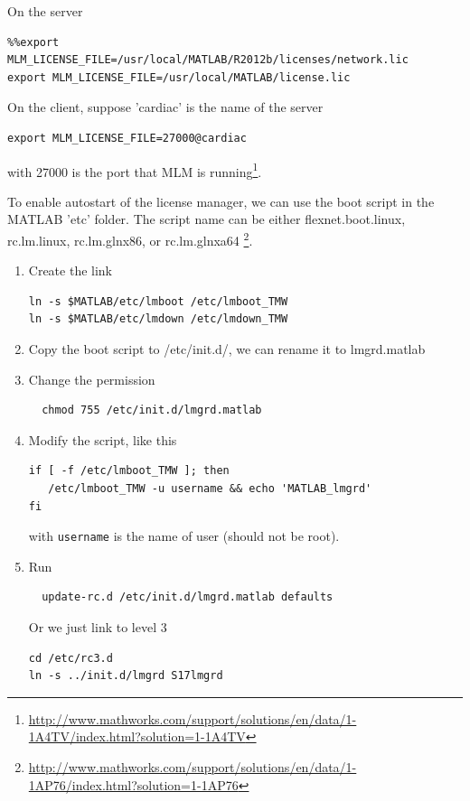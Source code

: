 On the server
\begin{verbatim}
%%export MLM_LICENSE_FILE=/usr/local/MATLAB/R2012b/licenses/network.lic
export MLM_LICENSE_FILE=/usr/local/MATLAB/license.lic
\end{verbatim}
On the client, suppose 'cardiac' is the name of the server
\begin{verbatim}
export MLM_LICENSE_FILE=27000@cardiac
\end{verbatim}
with 27000 is the port that MLM is
running\footnote{\url{http://www.mathworks.com/support/solutions/en/data/1-1A4TV/index.html?solution=1-1A4TV}}.

To enable autostart of the license manager, we can use the boot script in the
MATLAB 'etc' folder. The script name can be either  flexnet.boot.linux,
rc.lm.linux, rc.lm.glnx86, or rc.lm.glnxa64
\footnote{\url{http://www.mathworks.com/support/solutions/en/data/1-1AP76/index.html?solution=1-1AP76}}.
\begin{enumerate}
  \item Create the link
  \begin{verbatim}
ln -s $MATLAB/etc/lmboot /etc/lmboot_TMW
ln -s $MATLAB/etc/lmdown /etc/lmdown_TMW
  \end{verbatim}
  
  \item Copy the boot script to /etc/init.d/, we can rename it to lmgrd.matlab
  \item Change the permission
  \begin{verbatim}
  chmod 755 /etc/init.d/lmgrd.matlab
  \end{verbatim}
  
  \item Modify the script, like this
  \begin{verbatim}
if [ -f /etc/lmboot_TMW ]; then
   /etc/lmboot_TMW -u username && echo 'MATLAB_lmgrd'
fi
  \end{verbatim}
  with \verb!username! is the name of user (should not be root).
  
  \item Run 
  \begin{verbatim}
  update-rc.d /etc/init.d/lmgrd.matlab defaults
  \end{verbatim}
  Or we just link to level 3
  \begin{verbatim}
cd /etc/rc3.d
ln -s ../init.d/lmgrd S17lmgrd
  \end{verbatim}
  
\end{enumerate}


